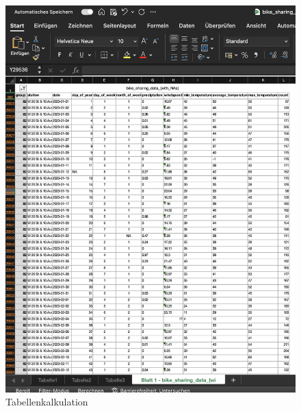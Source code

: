 \documentclass{article}
\begin{document}
\begin{figure}[ht]
    \centering
    \begin{minipage}{0.45\textwidth}
        \centering
        \includegraphics[width=\textwidth]{Tabellenkalkulation.png}
        \caption{Tabellenkalkulation}
        \label{fig:bild1}
    \end{minipage}
    \hfill
    \begin{minipage}{0.45\textwidth}
        \centering

\end{minipage}
\end{figure}
\end{document}
